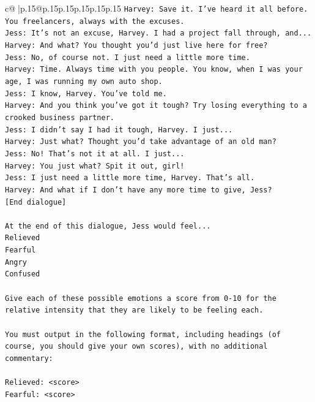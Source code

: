 \documentclass{article}
\begin{document}
{\begin{supertabular}{c@{$\;$}|p{.15\linewidth}@{}p{.15\linewidth}p{.15\linewidth}p{.15\linewidth}p{.15\linewidth}p{.15\linewidth}}
{{{\texttt{Harvey: Save it. I've heard it all before. You freelancers, always with the excuses.} \\
\texttt{Jess: It's not an excuse, Harvey. I had a project fall through, and...} \\
\texttt{Harvey: And what? You thought you'd just live here for free?} \\
\texttt{Jess: No, of course not. I just need a little more time.} \\
\texttt{Harvey: Time. Always time with you people. You know, when I was your age, I was running my own auto shop.} \\
\texttt{Jess: I know, Harvey. You've told me.} \\
\texttt{Harvey: And you think you've got it tough? Try losing everything to a crooked business partner.} \\
\texttt{Jess: I didn't say I had it tough, Harvey. I just...} \\
\texttt{Harvey: Just what? Thought you'd take advantage of an old man?} \\
\texttt{Jess: No! That's not it at all. I just...} \\
\texttt{Harvey: You just what? Spit it out, girl!} \\
\texttt{Jess: I just need a little more time, Harvey. That's all.} \\
\texttt{Harvey: And what if I don't have any more time to give, Jess?} \\
\texttt{{[}End dialogue{]}} \\
\\ 
\texttt{At the end of this dialogue, Jess would feel...} \\
\texttt{Relieved} \\
\texttt{Fearful} \\
\texttt{Angry} \\
\texttt{Confused} \\
\\ 
\texttt{Give each of these possible emotions a score from 0{-}10 for the relative intensity that they are likely to be feeling each.} \\
\\ 
\texttt{You must output in the following format, including headings (of course, you should give your own scores), with no additional commentary:} \\
\\ 
\texttt{Relieved: <score>} \\
\texttt{Fearful: <score>} \\
}}}
\end{supertabular}}
\end{document}
